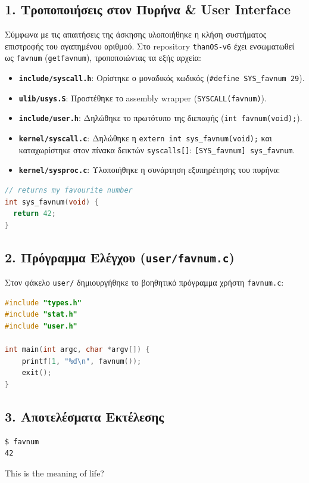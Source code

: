 \documentclass[11pt,a4paper]{article}
\begin{document}
\subsection*{1. Τροποποιήσεις στον Πυρήνα \& User Interface}
Σύμφωνα με τις απαιτήσεις της άσκησης υλοποιήθηκε η κλήση συστήματος επιστροφής του αγαπημένου αριθμού. 
Στο repository \texttt{thanOS-v6} έχει ενσωματωθεί ως \texttt{favnum} (\texttt{getfavnum}), τροποποιώντας τα εξής αρχεία:
\begin{itemize}
    \item \textbf{\texttt{include/syscall.h}}: Ορίστηκε ο μοναδικός κωδικός (\texttt{\#define SYS\_favnum 29}).
    \item \textbf{\texttt{ulib/usys.S}}: Προστέθηκε το assembly wrapper (\texttt{SYSCALL(favnum)}).
    \item \textbf{\texttt{include/user.h}}: Δηλώθηκε το πρωτότυπο της διεπαφής (\texttt{int favnum(void);}).
    \item \textbf{\texttt{kernel/syscall.c}}: Δηλώθηκε η \texttt{extern int sys\_favnum(void);} και καταχωρίστηκε στον πίνακα δεικτών 
    \texttt{syscalls[]}: \texttt{[SYS\_favnum] sys\_favnum}.
    \item \textbf{\texttt{kernel/sysproc.c}}: Υλοποιήθηκε η συνάρτηση εξυπηρέτησης του πυρήνα:
\end{itemize}

\begin{lstlisting}[language=C, caption={Η trivial υλοποίηση sys\_favnum στο kernel/sysproc.c}]
// returns my favourite number
int sys_favnum(void) {
  return 42;
}
\end{lstlisting}

\subsection*{2. Πρόγραμμα Ελέγχου (\texttt{user/favnum.c})}
Στον φάκελο \texttt{user/} δημιουργήθηκε το βοηθητικό πρόγραμμα χρήστη \texttt{favnum.c}:

\begin{lstlisting}[language=C, caption={Πρόγραμμα δοκιμής favnum (user/favnum.c)}]
#include "types.h"
#include "stat.h"
#include "user.h"

int main(int argc, char *argv[]) {
    printf(1, "%d\n", favnum());
    exit();
}
\end{lstlisting}

\subsection*{3. Αποτελέσματα Εκτέλεσης}
\begin{lstlisting}[style=termstyle, caption={Εκτέλεση της εντολής favnum στο τερματικό του xv6}]
$ favnum
42
\end{lstlisting}
This is the meaning of life?
\end{document}
